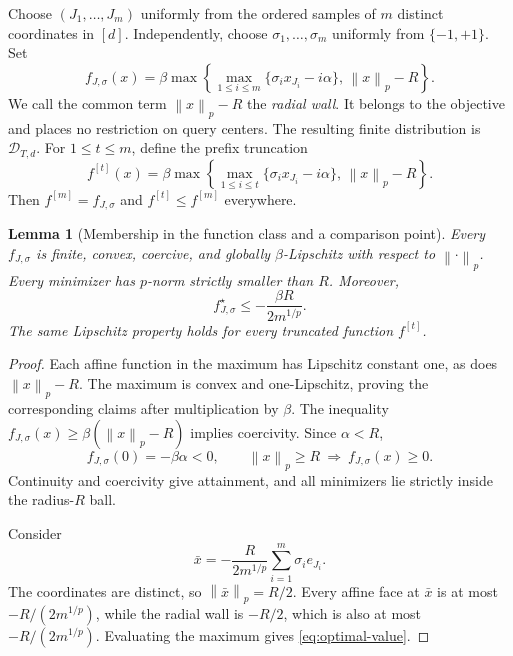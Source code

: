 \documentclass[11pt]{article}
\newtheorem{lemma}[theorem]{Lemma}
\theoremstyle{definition}
\theoremstyle{remark}
\newcommand{\norm}[1]{\left\lVert#1\right\rVert}
\newcommand{\D}{\mathcal D}
\begin{document}
Choose $(J_1,\ldots,J_m)$ uniformly from the ordered samples of $m$
distinct coordinates in $[d]$. Independently, choose
$\sigma_1,\ldots,\sigma_m$ uniformly from $\{-1,+1\}$. Set
\begin{equation}\label{eq:hard-family}
f_{J,\sigma}(x)
=\beta\max\left\{
\max_{1\le i\le m}\{\sigma_i x_{J_i}-i\alpha\},\,
\norm{x}_p-R
\right\}.
\end{equation}
We call the common term $\norm{x}_p-R$ the \emph{radial wall}.
It belongs to the objective and places no restriction on query centers.
The resulting finite distribution is $\D_{T,d}$.
For $1\le t\le m$, define the prefix truncation
\begin{equation}\label{eq:truncated}
f^{[t]}(x)
=\beta\max\left\{
\max_{1\le i\le t}\{\sigma_i x_{J_i}-i\alpha\},\,
\norm{x}_p-R
\right\}.
\end{equation}
Then $f^{[m]}=f_{J,\sigma}$ and $f^{[t]}\le f^{[m]}$ everywhere.

\begin{lemma}[Membership in the function class and a comparison point]\label{lem:legal}
Every $f_{J,\sigma}$ is finite, convex, coercive, and globally
$\beta$-Lipschitz with respect to $\norm{\cdot}_p$. Every minimizer has $p$-norm
strictly smaller than $R$. Moreover,
\begin{equation}\label{eq:optimal-value}
f_{J,\sigma}^\star\le-\frac{\beta R}{2m^{1/p}}.
\end{equation}
The same Lipschitz property holds for every truncated function $f^{[t]}$.
\end{lemma}

\begin{proof}
Each affine function in the maximum has Lipschitz constant one, as does
$\norm{x}_p-R$. The maximum is convex and one-Lipschitz, proving the
corresponding claims after multiplication by $\beta$.
The inequality $f_{J,\sigma}(x)\ge\beta(\norm{x}_p-R)$ implies coercivity.
Since $\alpha<R$,
\[
f_{J,\sigma}(0)=-\beta\alpha<0,
\qquad
\norm{x}_p\ge R\ \Longrightarrow\ f_{J,\sigma}(x)\ge0.
\]
Continuity and coercivity give attainment, and all minimizers lie strictly
inside the radius-$R$ ball.

Consider
\begin{equation}\label{eq:comparator}
\bar x=-\frac{R}{2m^{1/p}}\sum_{i=1}^m\sigma_i e_{J_i}.
\end{equation}
The coordinates are distinct, so $\norm{\bar x}_p=R/2$. Every affine face at
$\bar x$ is at most $-R/(2m^{1/p})$, while the radial wall is $-R/2$,
which is also at most $-R/(2m^{1/p})$. Evaluating the maximum gives
\eqref{eq:optimal-value}.
\end{proof}
\end{document}
